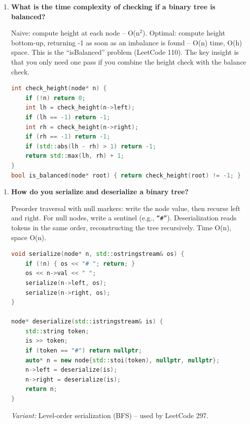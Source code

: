 \begin{enumerate}
\item \textbf{What is the time complexity of checking if a binary tree is balanced?}

Naive: compute height at each node -- O(n$^{2}$). Optimal: compute height bottom-up, returning -1 as soon as an imbalance is found -- O(n) time, O(h) space. This is the ``isBalanced'' problem (LeetCode 110). The key insight is that you only need one pass if you combine the height check with the balance check.

\begin{lstlisting}[language=C++]
int check_height(node* n) {
    if (!n) return 0;
    int lh = check_height(n->left);
    if (lh == -1) return -1;
    int rh = check_height(n->right);
    if (rh == -1) return -1;
    if (std::abs(lh - rh) > 1) return -1;
    return std::max(lh, rh) + 1;
}
bool is_balanced(node* root) { return check_height(root) != -1; }
\end{lstlisting}
\end{enumerate}

\begin{enumerate}
\item \textbf{How do you serialize and deserialize a binary tree?}

Preorder traversal with null markers: write the node value, then recurse left and right. For null nodes, write a sentinel (e.g., \texttt{``\#''}). Deserialization reads tokens in the same order, reconstructing the tree recursively. Time O(n), space O(n).

\begin{lstlisting}[language=C++]
void serialize(node* n, std::ostringstream& os) {
    if (!n) { os << "# "; return; }
    os << n->val << " ";
    serialize(n->left, os);
    serialize(n->right, os);
}

node* deserialize(std::istringstream& is) {
    std::string token;
    is >> token;
    if (token == "#") return nullptr;
    auto* n = new node{std::stoi(token), nullptr, nullptr};
    n->left = deserialize(is);
    n->right = deserialize(is);
    return n;
}
\end{lstlisting}

\textit{Variant:} Level-order serialization (BFS) -- used by LeetCode 297.
\end{enumerate}

